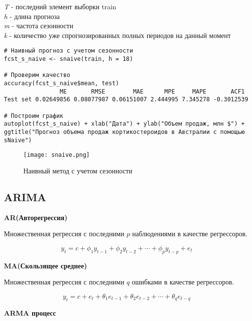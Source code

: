 \documentclass[a4paper,12pt]{article}
\theoremstyle{plain} %
\theoremstyle{definition} %
\theoremstyle{remark} %
\begin{document}
\begin{center}
  \textit{T} - последний элемент выборки train \\
  \textit{h} - длина прогноза \\
  \textit{m} - частота сезонности \\
  \textit{k} - количество уже спрогнозированных полных периодов на данный момент
\end{center}


\begin{verbatim}
# Наивный прогноз с учетом сезонности
fcst_s_naive <- snaive(train, h = 18)

# Проверим качество
accuracy(fcst_s_naive$mean, test)
                ME       RMSE        MAE      MPE     MAPE       ACF1
Test set 0.02649856 0.08077987 0.06151007 2.444995 7.345278 -0.3012539

# Построим график
autoplot(fcst_s_naive) + xlab("Дата") + ylab("Объем продаж, млн $") +
ggtitle("Прогноз объема продаж кортикостероидов в Австралии с помощью sNaive")

\end{verbatim}


\begin{figure}[H]
 \texttt{[image: snaive.png]}
 \caption{Наивный метод с учетом сезонности}
\end{figure}

\newpage

  \subsection{ARIMA}
  \textbf{AR(Авторегрессия)}

Множественная регрессия с последними $p$ наблюдениями в качестве регрессоров.

  \begin{equation}
    y_{t} = c + \phi_{1}y_{t-1} + \phi_{2}y_{t-2} + \cdots + \phi_{p}y_{t-p} + e_{t}
  \end{equation}

  \noindent\textbf{MA(Скользящее среднее)}

  Множественная регрессия с последними $q$ ошибками в качестве регрессоров.

\begin{equation}
  y_t = c + e_t + \theta_1 e_{t-1} + \theta_2 e_{t-2} + \cdots + \theta_q e_{t-q}
\end{equation}



  \noindent\textbf{ARMA процесс}
\end{document}
